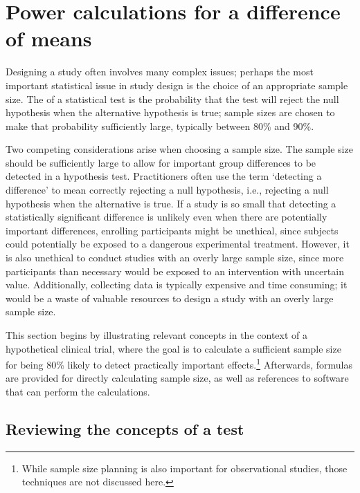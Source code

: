 \section[Power calculations for a difference of means]{Power calculations for a difference of means}
\label{PowerForDifferenceOfTwoMeans}

Designing a study often involves many complex issues; perhaps the most important statistical issue in study design is the choice of an appropriate sample size. The  of a statistical test is the probability that the test will reject the null hypothesis when the alternative hypothesis is true; sample sizes are chosen to make that probability sufficiently large, typically between 80\% and 90\%. 

Two competing considerations arise when choosing a sample size. The sample size should be sufficiently large to allow for important group differences to be detected in a hypothesis test. Practitioners often use the term `detecting a difference' to mean correctly rejecting a null hypothesis, i.e., rejecting a null hypothesis when the alternative is true. If a study is so small that detecting a statistically significant difference is unlikely even when there are potentially important differences, enrolling participants might be unethical, since subjects could potentially be exposed to a dangerous experimental treatment. However, it is also unethical to conduct studies with an overly large sample size, since more participants than necessary would be exposed to an intervention with uncertain value. Additionally, collecting data is typically expensive and time consuming; it would be a waste of valuable resources to design a study with an overly large sample size.

This section begins by illustrating relevant concepts in the context of a hypothetical clinical trial, where the goal is to calculate a sufficient sample size for being 80\% likely to detect practically important effects.\footnote{While sample size planning is also important for observational studies, those techniques are not discussed here.} Afterwards, formulas are provided for directly calculating sample size, as well as references to software that can perform the calculations.


\subsection{Reviewing the concepts of a test}

